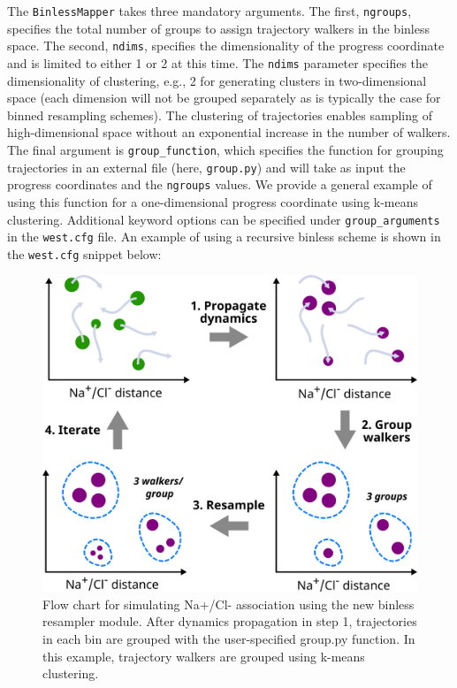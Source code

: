 The \verb|BinlessMapper| takes three mandatory arguments. 
The first, \verb|ngroups|, specifies the total number of groups to assign trajectory walkers in the binless space. 
The second, \verb|ndims|, specifies the dimensionality of the progress coordinate and is limited to either 1 or 2 at this time. 
The \verb|ndims| parameter specifies the dimensionality of clustering, e.g., 2 for generating clusters in two-dimensional space (each dimension will not be grouped separately as is typically the case for binned resampling schemes). 
The clustering of trajectories enables sampling of high-dimensional space without an exponential increase in the number of walkers. 
The final argument is \verb|group_function|, which specifies the function for grouping trajectories in an external file (here, \verb|group.py|) and will take as input the progress coordinates and the \verb|ngroups| values. 
We provide a general example of using this function for a one-dimensional progress coordinate using k-means clustering. 
Additional keyword options can be specified under \verb|group_arguments| in the \verb|west.cfg| file. 
An example of using a recursive binless scheme is shown in the \verb|west.cfg| snippet below:

\begin{figure}[t]
\centering
\includegraphics[width=\columnwidth]{figures/Figure3_binless.png}
\caption{Flow chart for simulating Na+/Cl- association using the new binless resampler module. 
After dynamics propagation in step 1, trajectories in each bin are grouped with the user-specified group.py function. 
In this example, trajectory walkers are grouped using k-means clustering.}
\end{figure}

